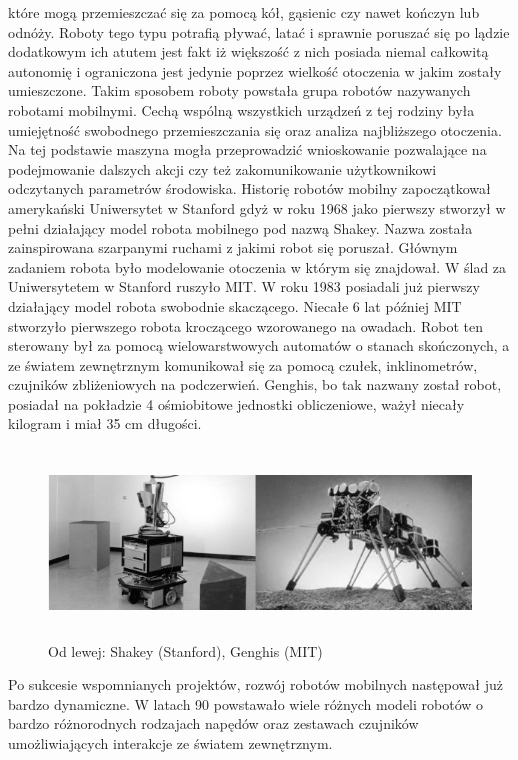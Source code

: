 które mogą przemieszczać się za pomocą kół, gąsienic czy nawet kończyn lub
odnóży. Roboty tego typu potrafią pływać, latać i sprawnie poruszać się
po lądzie dodatkowym ich atutem jest fakt iż większość z nich posiada niemal
całkowitą autonomię i ograniczona jest jedynie poprzez wielkość otoczenia w
jakim zostały umieszczone. Takim sposobem roboty powstała grupa robotów
nazywanych robotami mobilnymi. Cechą wspólną wszystkich urządzeń z tej rodziny
była umiejętność swobodnego przemieszczania się oraz analiza najbliższego
otoczenia. Na tej podstawie maszyna mogła przeprowadzić wnioskowanie pozwalające
na podejmowanie dalszych akcji czy też zakomunikowanie użytkownikowi odczytanych
parametrów środowiska.\newpage
Historię robotów mobilny zapoczątkował amerykański Uniwersytet w Stanford gdyż
w roku 1968 jako pierwszy stworzył w pełni działający model robota mobilnego pod
nazwą Shakey. Nazwa została zainspirowana szarpanymi ruchami z jakimi robot się
poruszał. Głównym zadaniem robota było modelowanie otoczenia w którym się
znajdował. W ślad za Uniwersytetem w Stanford ruszyło MIT. W roku 1983 posiadali
już pierwszy działający model robota swobodnie skaczącego. Niecałe 6
lat później MIT stworzyło pierwszego robota kroczącego wzorowanego na owadach.
Robot ten sterowany był za pomocą wielowarstwowych automatów o stanach
skończonych, a ze światem zewnętrznym komunikował się za pomocą czułek,
inklinometrów, czujników zbliżeniowych na podczerwień. Genghis, bo tak
nazwany został robot, posiadał na pokładzie 4 ośmiobitowe jednostki obliczeniowe, ważył
niecały kilogram i miał 35 cm długości.

\begin{figure}[hb]
 \centering
 \includegraphics[height=50mm]{../images/ch01/shakey_and_genghis.png}
 \caption{Od lewej: Shakey (Stanford), Genghis (MIT) }
 \label{fig:RobotsHistory_Shakey_Genghis}
\end{figure}

Po sukcesie wspomnianych projektów,
rozwój robotów mobilnych następował już bardzo dynamiczne. W latach 90
powstawało wiele różnych modeli robotów o bardzo różnorodnych rodzajach napędów
oraz zestawach czujników umożliwiających interakcje ze światem zewnętrznym.

